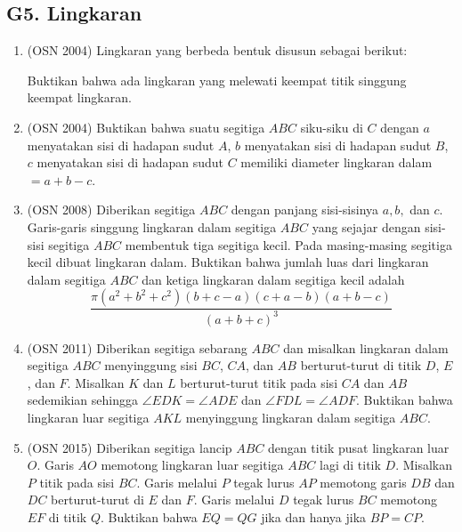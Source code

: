 \documentclass[12pt,a4paper]{article}
\begin{document}
\subsection{G5. Lingkaran}
\begin{enumerate}

\item (OSN 2004) Lingkaran yang berbeda bentuk disusun sebagai berikut:


Buktikan bahwa ada lingkaran yang melewati keempat titik singgung keempat lingkaran.

\item (OSN 2004) Buktikan bahwa suatu segitiga $ABC$ siku-siku di $C$ dengan $a$ menyatakan sisi di hadapan sudut $A$, $b$ menyatakan sisi di hadapan sudut $B$, $c$ menyatakan sisi di hadapan sudut $C$ memiliki diameter lingkaran dalam $=a+b-c.$

\item (OSN 2008) Diberikan segitiga $ABC$ dengan panjang sisi-sisinya $a, b,$ dan $c$. Garis-garis singgung lingkaran dalam segitiga $ABC$ yang sejajar dengan sisi-sisi segitiga $ABC$ membentuk tiga segitiga kecil. Pada masing-masing segitiga kecil dibuat lingkaran dalam. Buktikan bahwa jumlah luas dari lingkaran dalam segitiga $ABC$ dan ketiga lingkaran dalam segitiga kecil adalah
$$\frac{\pi(a^{2}+b^{2}+c^{2})(b+c-a)(c+a-b)(a+b-c)}{(a+b+c)^{3}}$$

\item (OSN 2011) Diberikan segitiga sebarang $ABC$ dan misalkan lingkaran dalam segitiga $ABC$ menyinggung sisi $BC$, $CA$, dan $AB$ berturut-turut di titik $D$, $E$, dan $F$. Misalkan $K$ dan $L$ berturut-turut titik pada sisi $CA$ dan $AB$ sedemikian sehingga $\angle EDK=\angle ADE$ dan $\angle FDL=\angle ADF.$ Buktikan bahwa lingkaran luar segitiga $AKL$ menyinggung lingkaran dalam segitiga $ABC$.

\item (OSN 2015) Diberikan segitiga lancip $ABC$ dengan titik pusat lingkaran luar $O$. Garis $AO$ memotong lingkaran luar segitiga $ABC$ lagi di titik $D$. Misalkan $P$ titik pada sisi $BC$. Garis melalui $P$ tegak lurus $AP$ memotong garis $DB$ dan $DC$ berturut-turut di $E$ dan $F$. Garis melalui $D$ tegak lurus $BC$ memotong $EF$ di titik $Q$. Buktikan bahwa $EQ=QG$ jika dan hanya jika $BP=CP$.


\end{enumerate}
\end{document}
